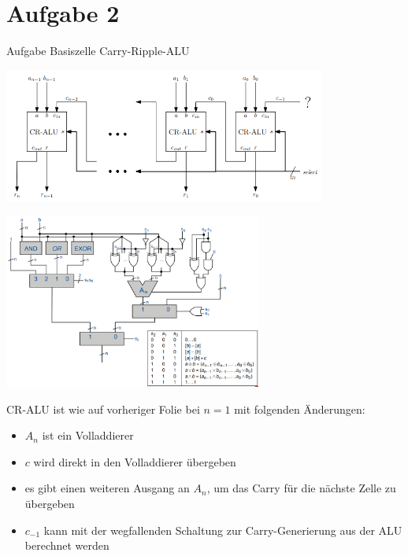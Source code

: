 
\section{Aufgabe 2}

\setcounter{exercise}{1}

\begin{frame}[allowframebreaks]{Aufgabe \thesection}{Basiszelle Carry-Ripple-ALU}

\begin{exercisenoinc}
    \center\includegraphics[width=300pt]{figures/CR-ALU.png}
\end{exercisenoinc}

\begin{requirementsnoinc}
    \center\includegraphics[width=240pt]{figures/ALU_logic.png}
\end{requirementsnoinc}

\begin{solutionnoinc}
CR-ALU ist wie auf vorheriger Folie bei $n=1$ mit folgenden Änderungen:
    \begin{itemize}
        \item $A_n$ ist ein Volladdierer
        \item $c$ wird direkt in den Volladdierer übergeben
        \item es gibt einen weiteren Ausgang an $A_n$, um das Carry für die nächste Zelle zu übergeben
        \item $c_{−1}$ kann mit der wegfallenden Schaltung zur Carry-Generierung aus der ALU berechnet werden
    \end{itemize}
\end{solutionnoinc}


\end{frame}
